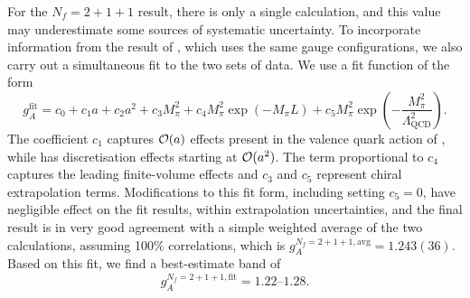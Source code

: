 For the $N_f = 2+1+1$ result, there is only a single calculation, and this value may underestimate some sources of systematic uncertainty. To incorporate
information from the result of \cite{Berkowitz:2017gql}, which uses the same gauge configurations, we also carry out a simultaneous fit to the two
sets of data. We use a fit function of the form
\begin{equation}
g_A^{\mathrm{fit}} = c_0 + c_1a + c_2a^2 + c_3M_\pi^2 + c_4M_\pi^2 \exp(−M_\pi L) +c_5M_\pi^2 \exp\left(-\frac{M_\pi^2}{\Lambda_{\mathrm{QCD}}^2}\right).
\end{equation}
The coefficient $c_1$ captures ${\cal O}(a)$ effects
present in the valence quark action of \cite{Bhattacharya:2016zcn}, while \cite{Berkowitz:2017gql} has discretisation effects starting at ${\cal O}(a^2)$. The 
term proportional to $c_4$ captures the leading finite-volume effects and $c_3$ and $c_5$ represent chiral extrapolation terms. Modifications to this fit form,
including  setting $c_5 = 0$,
have negligible effect on the fit results, within extrapolation uncertainties, and the final result is in very good agreement with a simple weighted average
of the two calculations, assuming 100\% correlations, which is $g_A^{N_f=2+1+1,\mathrm{avg}} = 1.243(36)$. Based on this fit, we find a best-estimate band
of
\begin{equation}\label{eq:gAfit}
g_A^{N_f=2+1+1,\mathrm{fit}} = \numrange{1.22}{1.28}.
\end{equation}

